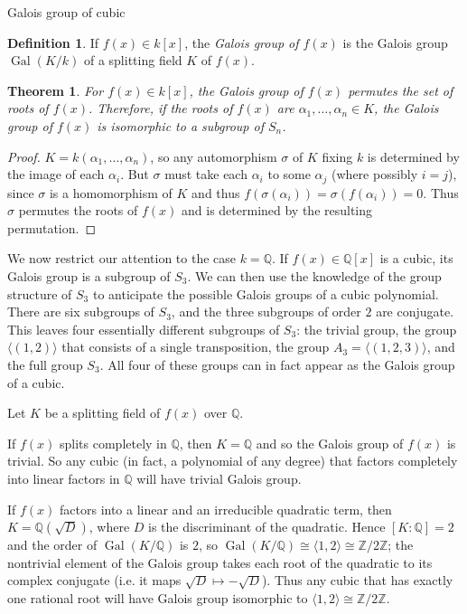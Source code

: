 \documentclass[a4paper,10pt]{article}
\newcommand{\Rats}{\ensuremath{\mathbb Q}}
\newcommand{\Ints}{\ensuremath{\mathbb Z}}
\DeclareMathOperator{\Gal}{Gal}
\newtheorem{thm}{Theorem}%
\theoremstyle{definition}
\newtheorem{defn}{Definition}
\begin{document}
\begin{center}{\Large
Galois group of cubic
}\end{center}

\begin{defn} If $f(x)\in k[x]$, the \emph{Galois group of $f(x)$} is the Galois
group $\Gal(K/k)$ of a splitting field $K$ of $f(x)$.
\end{defn}

\begin{thm} For $f(x)\in k[x]$, the Galois group of $f(x)$ permutes the set of
roots of $f(x)$. Therefore, if the roots of $f(x)$ are
$\alpha_1,\ldots,\alpha_n\in K$, the Galois group of $f(x)$ is isomorphic to a
subgroup of $S_n$.
\end{thm}
\begin{proof}
$K=k(\alpha_1,\ldots,\alpha_n)$, so any automorphism $\sigma$ of
$K$ fixing $k$ is determined by the image of each $\alpha_i$. But $\sigma$ must
take each $\alpha_i$ to some $\alpha_j$ (where possibly $i=j$), since $\sigma$
is a homomorphism of $K$ and thus $f(\sigma(\alpha_i))=\sigma(f(\alpha_i))=0$.
Thus $\sigma$ permutes the roots of $f(x)$ and is determined by the resulting
permutation.
\end{proof}

We now restrict our attention to the case $k=\Rats$. If $f(x)\in\Rats[x]$ is a
cubic, its Galois group is a subgroup of $S_3$. We can then use the knowledge of
the group structure of $S_3$ to anticipate the possible Galois groups of a cubic
polynomial. There are six subgroups of $S_3$, and the three subgroups of order
$2$ are conjugate. This leaves four essentially different subgroups of $S_3$:
the trivial group, the group $\langle(1,2)\rangle$ that consists of a single
transposition, the group $A_3=\langle (1,2,3)\rangle$, and the full group $S_3$.
All four of these groups can in fact appear as the Galois group of a cubic.

Let $K$ be a splitting field of $f(x)$ over $\Rats$.

If $f(x)$ splits completely in $\Rats$, then $K=\Rats$ and so the Galois group
of $f(x)$ is trivial. So any cubic (in fact, a polynomial of any degree) that
factors completely into linear factors in $\Rats$ will have trivial Galois
group.

If $f(x)$ factors into a linear and an irreducible quadratic term, then
$K=\Rats(\sqrt{D})$, where $D$ is the discriminant of the quadratic. Hence
$[K:\Rats]=2$ and the order of $\Gal(K/\Rats)$ is $2$, so $\Gal(K/\Rats)\cong
\langle1,2\rangle\cong\Ints/2\Ints$; the nontrivial element of the Galois group
takes each root of the quadratic to its complex conjugate (i.e. it maps
$\sqrt{D}\mapsto -\sqrt{D}$). Thus any cubic that has exactly one rational root
will have Galois group isomorphic to $\langle 1,2\rangle\cong \Ints/2\Ints$.
\end{document}
